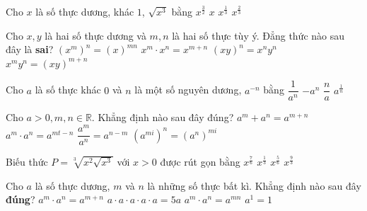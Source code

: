 \begin{ex}%
	Cho $x$ là số thực dương, khác $1$, $\sqrt{x^3}$  bằng
	 \choice
		{\True $x^{\frac{3}{2}}$} 
		 {$x$}
		 {$x^{\frac{1}{3}}$}
		{$x^{\frac{2}{3}}$} 
\end{ex}

\begin{ex}%
	Cho $x, y$ là hai số thực dương và $m, n$ là hai số thực tùy ý. Đẳng thức nào sau đây là {\bfseries sai}? 
	\choice 
		 {$\left(x^{m}\right)^{n}=(x)^{m n}$}
		 {$x^{m}\cdot x^{n}=x^{m+n}$}
		{$(x  y)^{n}=x^{n}y^{n}$}
		{\True$x^{m}y^{n}=(x y)^{m+n}$} 
\end{ex}

\begin{ex}%
	Cho $a$ là  số thực khác $0$ và $n$ là một số nguyên dương, $a^{-n}$ bằng
	 \choice
		{\True $\dfrac{1}{a^n}$} 
		 {$-a^n$}
		 {$\dfrac{n}{a}$}
		 {$a^{\frac{1}{n}}$}
\end{ex}

\begin{ex}%
	Cho  $a>0, m,n \in \mathbb{R}$. Khẳng định nào sau đây đúng?
	\choice 
		 {$a^m+a^n=a^{m+n}$}
		 {$a^m\cdot a^n=a^{mt-n}$}
		{$\dfrac{a^m}{a^n}=a^{n-m}$} 
		{\True $\left(a^{mi}\right)^n=\left(a^n\right)^{mi}$} 
\end{ex}

\begin{ex}%
	Biếu  thức $P=\sqrt[3]{x^2 \sqrt{x^3}}$ với $x>0$ được rút gọn bằng
	\choice 
		{\True  $x^{\frac{7}{6}}$}
		{$x^{\frac{1}{3}}$} 
		 {$x^{\frac{5}{6}}$}
		 {$x^{\frac{9}{3}}$}
\end{ex}

\begin{ex}%
	Cho $a$ là số thực dương, $m$ và $n$ là những số  thực bất kì. Khẳng định nào sau đây \textbf{đúng}?
	\choice 
		{\True $a^m\cdot a^n=a^{m+n}$} 
		{$a\cdot a\cdot a\cdot  a\cdot a=5a$}
		 {$a^m\cdot a^n=a^{mn}$}
		 {$a^1=1$}
\end{ex}

